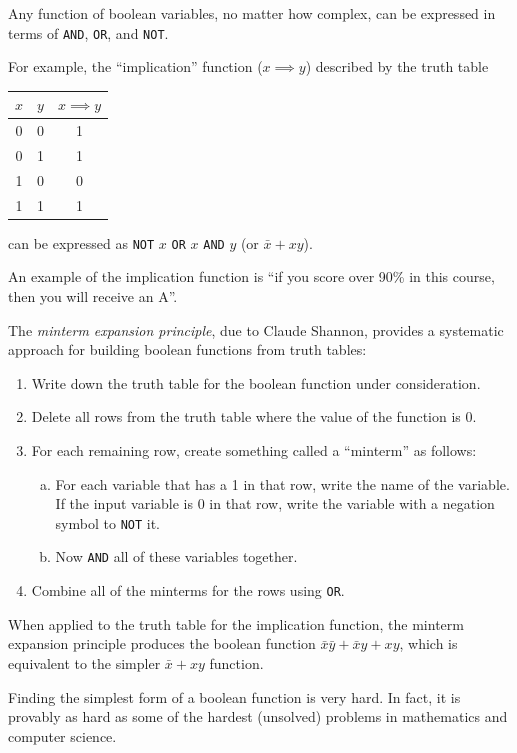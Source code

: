 \documentclass[8pt,a4paper,compress,handout]{beamer}
\begin{document}
\begin{frame}[fragile]
Any function of boolean variables, no matter how complex, can be expressed in terms of \lstinline{AND}, \lstinline{OR}, and \lstinline{NOT}.

\bigskip

For example, the ``implication'' function ($x \implies y$) described by the truth table
\begin{center}
\begin{tabular}{cc|c}
$x$ & $y$ & $x \implies y$ \\ \hline
0 & 0 & 1 \\
0 & 1 & 1 \\
1 & 0 & 0 \\
1 & 1 & 1
\end{tabular}
\end{center}
can be expressed as \lstinline{NOT} $x$ \lstinline{OR} $x$ \lstinline{AND} $y$ (or $\bar{x}+xy$).

\bigskip

An example of the implication function is ``if you score over 90\% in this course, then you will receive an A''.
\end{frame}

\begin{frame}[fragile]
The \emph{minterm expansion principle}, due to Claude Shannon, provides a systematic approach for building boolean functions from truth tables:
\begin{enumerate}
\item Write down the truth table for the boolean function under consideration.

\item Delete all rows from the truth table where the value of the function is 0.

\item For each remaining row, create something called a ``minterm'' as follows:
\begin{enumerate}[a.]
\item For each variable that has a 1 in that row, write the name of the variable. If the input variable is 0 in that row, write the variable with a negation symbol to \lstinline{NOT} it.

\item Now \lstinline{AND} all of these variables together.
\end{enumerate}

\item Combine all of the minterms for the rows using \lstinline{OR}.
\end{enumerate}

\bigskip

When applied to the truth table for the implication function, the minterm expansion principle produces the boolean function $\bar{x}\bar{y}+\bar{x}y+xy$, which is equivalent to the simpler $\bar{x}+xy$ function.

\bigskip

Finding the simplest form of a boolean function is very hard. In fact, it is provably as hard as some of the hardest (unsolved) problems in mathematics and computer science.
\end{frame}
\end{document}
